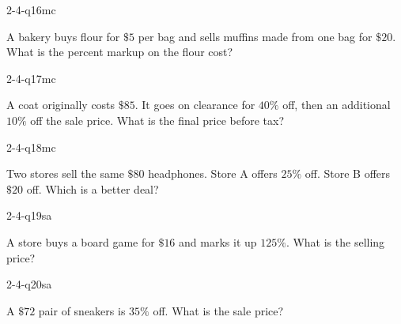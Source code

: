 \begin{practiceQuestion}{2-4-q16}{mc}
\begin{questionText}
A bakery buys flour for $\$5$ per bag and sells muffins made from one bag for $\$20$. What is the percent markup on the flour cost?
\end{questionText}
\end{practiceQuestion}

\begin{practiceQuestion}{2-4-q17}{mc}
\begin{questionText}
A coat originally costs $\$85$. It goes on clearance for $40\%$ off, then an additional $10\%$ off the sale price. What is the final price before tax?
\end{questionText}
\end{practiceQuestion}

\begin{practiceQuestion}{2-4-q18}{mc}
\begin{questionText}
Two stores sell the same $\$80$ headphones. Store A offers $25\%$ off. Store B offers $\$20$ off. Which is a better deal?
\end{questionText}
\end{practiceQuestion}


\begin{practiceQuestion}{2-4-q19}{sa}
\begin{questionText}
A store buys a board game for $\$16$ and marks it up $125\%$. What is the selling price?
\end{questionText}
\end{practiceQuestion}

\begin{practiceQuestion}{2-4-q20}{sa}
\begin{questionText}
A $\$72$ pair of sneakers is $35\%$ off. What is the sale price?
\end{questionText}
\end{practiceQuestion}

